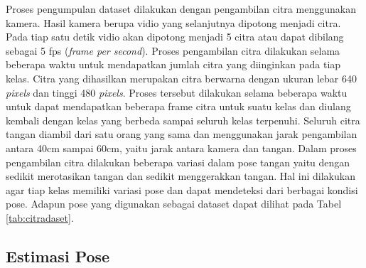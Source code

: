 Proses pengumpulan dataset dilakukan dengan pengambilan citra menggunakan kamera. Hasil kamera berupa vidio yang selanjutnya dipotong menjadi citra. Pada tiap satu detik vidio akan dipotong menjadi 5 citra atau dapat dibilang sebagai 5 fps (\emph{frame per second}). Proses pengambilan citra dilakukan selama beberapa waktu untuk mendapatkan jumlah citra yang diinginkan pada tiap kelas. Citra yang dihasilkan merupakan citra berwarna dengan ukuran lebar 640 \emph{pixels} dan tinggi 480 \emph{pixels}. Proses tersebut dilakukan selama beberapa waktu untuk dapat mendapatkan beberapa frame citra untuk suatu kelas dan diulang kembali dengan kelas yang berbeda sampai seluruh kelas terpenuhi. Seluruh citra tangan diambil dari satu orang yang sama dan menggunakan jarak pengambilan antara 40cm sampai 60cm, yaitu jarak antara kamera dan tangan. Dalam proses pengambilan citra dilakukan beberapa variasi dalam pose tangan yaitu dengan sedikit merotasikan tangan dan sedikit menggerakkan tangan. Hal ini dilakukan agar tiap kelas memiliki variasi pose dan dapat mendeteksi dari berbagai kondisi pose. Adapun pose yang digunakan sebagai dataset dapat dilihat pada Tabel \ref{tab:citradaset}.



\subsection{Estimasi Pose}

